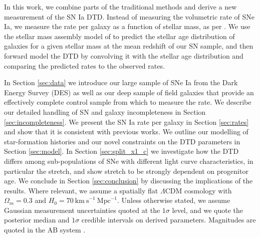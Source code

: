 \documentclass[fleqn,usenatbib]{mnras}
\begin{document}
In this work, we combine parts of the traditional methods and derive a new measurement of the SN Ia DTD. Instead of measuring the volumetric rate of SNe Ia, we measure the rate per galaxy as a function of stellar mass, as per \citet{Sullivan2006,Smith2012}. We use the stellar mass assembly model of  to predict the stellar age distribution of galaxies for a given stellar mass at the mean redshift of our SN sample, and then forward model the DTD by convolving it with the stellar age distribution and comparing the predicted rates to the observed rates.

In Section \ref{sec:data} we introduce our large sample of SNe Ia from the Dark Energy Survey (DES) as well as our deep sample of field galaxies that provide an effectively complete control sample from which to measure the rate. We describe our detailed handling of SN and galaxy incompleteness in Section \ref{sec:incompleteness}. We present the SN Ia rate per galaxy in Section \ref{sec:rates} and show that it is consistent with previous works. We outline our modelling of star-formation histories and our novel constraints on the DTD parameters in Section \ref{sec:model}. In Section \ref{sec:split_x1_c} we investigate how the DTD differs among sub-populations of SNe with different light curve characteristics, in particular the stretch, and show stretch to be strongly dependent on progenitor age. We conclude in Section \ref{sec:conclusion} by discussing the implications of the results.
Where relevant, we assume a spatially flat $\Lambda$CDM cosmology with $\Omega_m = 0.3$ and $H_0 = 70 \mathrm{~km~s}^{-1}~\mathrm{Mpc}^{-1}$. Unless otherwise stated, we assume Gaussian measurement uncertainties quoted at the $1\sigma$ level, and we quote the posterior median and $1\sigma$ credible intervals on derived parameters. Magnitudes are quoted in the AB system \citep{Oke1983}.
\end{document}

